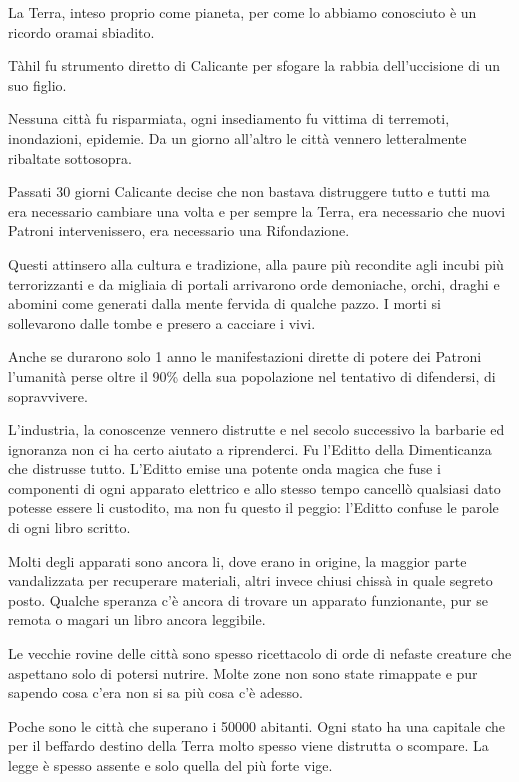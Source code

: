 \begin{multicols}{2}

\label{terra}

La Terra, inteso proprio come pianeta, per come lo abbiamo conosciuto è un ricordo oramai sbiadito.

Tàhil fu strumento diretto di Calicante per sfogare la rabbia dell'uccisione di un suo figlio.

Nessuna città fu risparmiata, ogni insediamento fu vittima di terremoti, inondazioni, epidemie. Da un giorno all'altro le città vennero letteralmente ribaltate sottosopra.

Passati 30 giorni Calicante decise che non bastava distruggere tutto e tutti ma era necessario cambiare una volta e per sempre la Terra, era necessario che nuovi Patroni intervenissero, era necessario una Rifondazione.

Questi attinsero alla cultura e tradizione, alla paure più recondite agli incubi più terrorizzanti e da migliaia di portali arrivarono orde demoniache, orchi, draghi e abomini come generati dalla mente fervida di qualche pazzo. I morti si sollevarono dalle tombe e presero a cacciare i vivi.

Anche se durarono solo 1 anno le manifestazioni dirette di potere dei Patroni l'umanità perse oltre il 90\% della sua popolazione nel tentativo di difendersi, di sopravvivere.

L'industria, la conoscenze vennero distrutte e nel secolo successivo la barbarie ed ignoranza non ci ha certo aiutato a riprenderci.
Fu l'Editto della Dimenticanza che distrusse tutto. L'Editto emise una potente onda magica che fuse i componenti di ogni apparato elettrico e allo stesso tempo cancellò qualsiasi dato potesse essere li custodito, ma non fu questo il peggio: l'Editto confuse le parole di ogni libro scritto.

Molti degli apparati sono ancora li, dove erano in origine, la maggior parte vandalizzata per recuperare materiali, altri invece chiusi chissà in quale segreto posto. Qualche speranza c'è ancora di trovare un apparato funzionante, pur se remota o magari un libro ancora leggibile.

Le vecchie rovine delle città sono spesso ricettacolo di orde di nefaste creature che aspettano solo di potersi nutrire. Molte zone non sono state rimappate e pur sapendo cosa c'era non si sa più cosa c'è adesso.

Poche sono le città che superano i 50000 abitanti. Ogni stato ha una capitale che per il beffardo destino della Terra molto spesso viene distrutta o scompare. La legge è spesso assente e solo quella del più forte vige.


\end{multicols}
